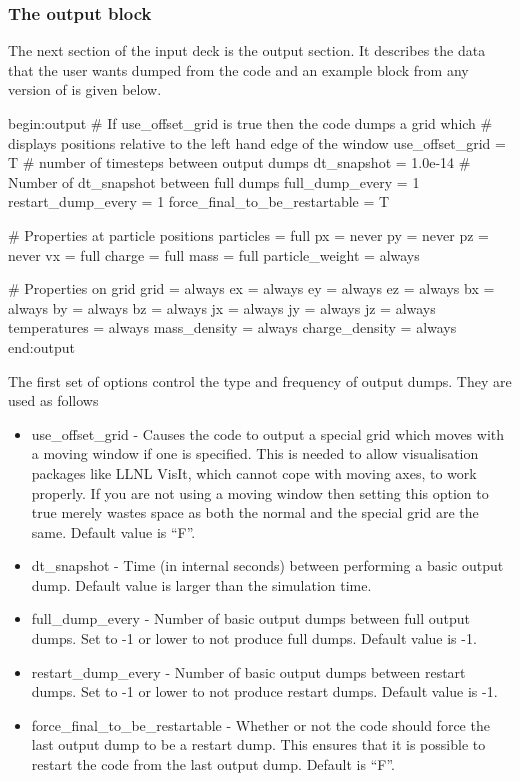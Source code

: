 \subsubsection{The output block}
The next section of the input deck is the output section. It describes the
data that the user wants dumped from the code and an example block from any
version of {\EPOCH} is given below.
\begin{boxverbatim}
begin:output
   # If use_offset_grid is true then the code dumps a grid which
   # displays positions relative to the left hand edge of the window
   use_offset_grid = T
   # number of timesteps between output dumps
   dt_snapshot = 1.0e-14
   # Number of dt_snapshot between full dumps
   full_dump_every = 1
   restart_dump_every = 1
   force_final_to_be_restartable = T

   # Properties at particle positions
   particles = full
   px = never
   py = never
   pz = never
   vx = full
   charge = full
   mass = full
   particle_weight = always

   # Properties on grid
   grid = always
   ex = always
   ey = always
   ez = always
   bx = always
   by = always
   bz = always
   jx = always
   jy = always
   jz = always
   temperatures = always
   mass_density = always
   charge_density = always
end:output
\end{boxverbatim}

The first set of options control the type and frequency of output dumps. They
are used as follows\\
\begin{itemize}
\item use\_offset\_grid - Causes the code to output a special grid which moves
  with a moving window if one is specified. This is needed to allow
  visualisation packages like LLNL VisIt, which cannot cope with moving axes, to
  work properly. If you are not using a moving window then setting this option
  to true merely wastes space as both the normal and the special grid are the
  same. Default value is ``F''.
\item dt\_snapshot - Time (in internal seconds) between performing a basic
  output dump. Default value is larger than the simulation time.
\item full\_dump\_every - Number of basic output dumps between full output
  dumps. Set to -1 or lower to not produce full dumps. Default value is -1.
\item restart\_dump\_every - Number of basic output dumps between restart
  dumps. Set to -1 or lower to not produce restart dumps. Default value is -1.
\item force\_final\_to\_be\_restartable - Whether or not the code should force
  the last output dump to be a restart dump. This ensures that it is possible
  to restart the code from the last output dump. Default is ``F''.
\end{itemize}

